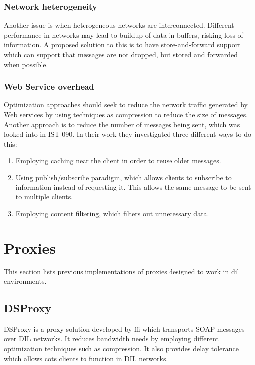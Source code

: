 \subsubsection{Network heterogeneity}

Another issue is when heterogeneous networks are interconnected. Different
performance in networks may lead to buildup of data in buffers, risking loss of
information. A proposed solution to this is to have store-and-forward support
which can support that messages are not dropped, but stored and forwarded when
possible.


\subsubsection{Web Service overhead}

Optimization approaches should seek to reduce the network traffic generated by
Web services by using techniques as compression to reduce the size of messages.
Another approach is to reduce the number of messages being sent, which was
looked into in IST-090\cite{ist-090}. In their work they investigated three
different ways to do this:

\begin{enumerate}
    \item Employing caching near the client in order to reuse older messages.
    \item Using publish/subscribe paradigm, which allows clients to subscribe to
    information instead of requesting it. This allows the same message to be sent
    to multiple clients.
    \item Employing content filtering, which filters out unnecessary data.
\end{enumerate}


\section{Proxies}

This section lists previous implementations of proxies designed to work in
\gls{dil} environments.


\subsection{DSProxy}

DSProxy is a proxy solution developed by \gls{ffi} which transports SOAP
messages over DIL networks. It reduces bandwidth needs by employing different
optimization techniques such as compression. It also provides delay tolerance
which allows \gls{cots} clients to function in DIL networks.


